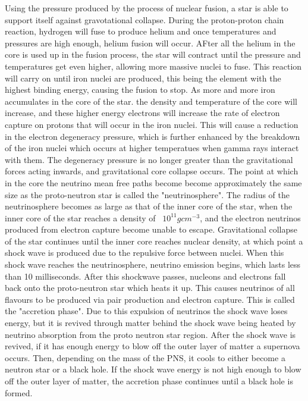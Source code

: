 Using the pressure produced by the process of nuclear fusion, a star is able to support itself against gravotational collapse. During the proton-proton chain reaction, hydrogen will fuse to produce helium and once temperatures and pressures are high enough, helium fusion will occur. AFter all the helium in the core is used up in the fusion process, the star will contract until the pressure and temperatures get even higher, allowing more massive nuclei to fuse. This reaction will carry on until iron nuclei are produced, this being the element with the highest binding energy, causing the fusion to stop.
\newline
As more and more iron accumulates in the core of the star. the density and temperature of the core will increase, and these higher energy electrons will increase the rate of electron capture on protons that will occur in the iron nuclei. This will cause a reduction in the electron degeneracy pressure, which is further enhanced by the breakdown of the iron nuclei which occurs at higher temperatues when gamma rays interact with them. The degeneracy pressure is no longer greater than the gravitational forces acting inwards, and gravitational core collapse occurs. The point at which in the core the neutrino mean free paths become become approximately the same size as the proto-neutron star is called the "neutrinosphere".  The radius of the neutrinosphere becomes as large as that of the inner core of the star, when the inner core of the star reaches a density of ~$10^{11} gcm^{-3}$, and the electron neutrinos produced from electron capture become unable to escape. Gravitational collapse of the star continues until the inner core reaches nuclear density, at which point a shock wave is produced due to the repulsive force between nuclei. When this shock wave reaches the neutrinosphere, neutrino emission begins, which lasts less than 10 milliseconds. After this shockwave passes, nucleons and electrons fall back onto the proto-neutron star which heats it up. This causes neutrinos of all flavours to be produced via pair production and electron capture. This is called the "accretion phase". Due to this expulsion of neutrinos the shock wave loses energy, but it is revived through matter behind the shock wave being heated by neutrino absorption from the proto neutron star region. After the shock wave is revived, if it has enough energy to blow off the outer layer of matter a supernova occurs. Then, depending on the mass of the PNS, it cools to either become a neutron star or a black hole. If the shock wave energy is not high enough to blow off the outer layer of matter, the accretion phase continues until a black hole is formed.

